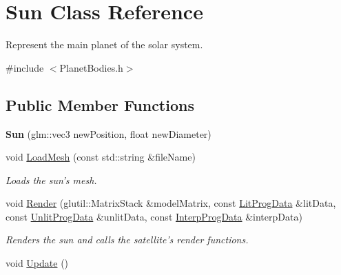 \hypertarget{class_sun}{\section{Sun Class Reference}
\label{class_sun}
}


Represent the main planet of the solar system.  




{\ttfamily \#include $<$Planet\-Bodies.\-h$>$}

\subsection*{Public Member Functions}
\begin{DoxyCompactItemize}
\item 
\hypertarget{class_sun_a64feb55bd0c09177f4fca12e6c37cbe4}{{\bfseries Sun} (glm\-::vec3 new\-Position, float new\-Diameter)}\label{class_sun_a64feb55bd0c09177f4fca12e6c37cbe4}

\item 
\hypertarget{class_sun_a3f3680c0b94268b85cc06e7eff70cb07}{void \hyperlink{class_sun_a3f3680c0b94268b85cc06e7eff70cb07}{Load\-Mesh} (const std\-::string \&file\-Name)}\label{class_sun_a3f3680c0b94268b85cc06e7eff70cb07}

\begin{DoxyCompactList}\small\item\em Loads the sun's mesh. \end{DoxyCompactList}\item 
void \hyperlink{class_sun_a84f041fbc0356455b1254600bdf3860f}{Render} (glutil\-::\-Matrix\-Stack \&model\-Matrix, const \hyperlink{struct_lit_prog_data}{Lit\-Prog\-Data} \&lit\-Data, const \hyperlink{struct_unlit_prog_data}{Unlit\-Prog\-Data} \&unlit\-Data, const \hyperlink{struct_interp_prog_data}{Interp\-Prog\-Data} \&interp\-Data)
\begin{DoxyCompactList}\small\item\em Renders the sun and calls the satellite's render functions. \end{DoxyCompactList}\item 
\hypertarget{class_sun_af3bfaeceea178c017478d25afa0dff07}{void \hyperlink{class_sun_af3bfaeceea178c017478d25afa0dff07}{Update} ()}\label{class_sun_af3bfaeceea178c017478d25afa0dff07}


\end{DoxyCompactItemize}
